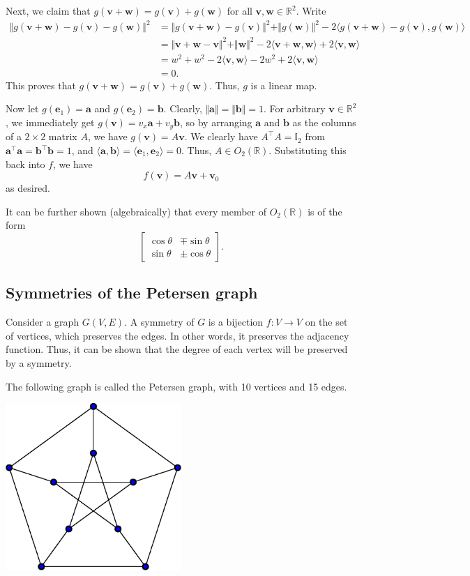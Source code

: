\documentclass[11pt]{article}
\newcommand{\R}{\mathbb{R}}
\renewcommand{\vec}[1]{\boldsymbol{#1}}
\newcommand{\vv}{\vec{v}}
\newcommand{\vw}{\vec{w}}
\newcommand{\ve}{\vec{e}}
\newcommand{\va}{\vec{a}}
\newcommand{\vb}{\vec{b}}
\newcommand{\norm}[1]{\Vert #1 \Vert}
\newcommand{\ip}[2]{\langle #1, #2 \rangle}
\theoremstyle{definition}
\theoremstyle{remark}
\numberwithin{equation}{section}
\begin{document}
    Next, we claim that $g(\vv + \vw) = g(\vv) + g(\vw)$ for all $\vv, \vw \in
    \R^2$. Write
    \begin{align*}
        \norm{g(\vv + \vw) - g(\vv) - g(\vw)}^2 &= \norm{g(\vv + \vw) - g(\vv)}^2 +
        \norm{g(\vw)}^2 - 2\ip{g(\vv + \vw) - g(\vv)}{g(\vw)} \\
        &= \norm{\vv + \vw - \vv}^2 + \norm{\vw}^2 - 2\ip{\vv + \vw}{\vw} +
        2\ip{\vv}{\vw} \\
        &= w^2 + w^2 - 2\ip{\vv}{\vw} - 2w^2 + 2\ip{\vv}{\vw} \\
        &= 0.
    \end{align*}
    This proves that $g(\vv + \vw) = g(\vv) + g(\vw)$. Thus, $g$ is a linear map.

    Now let $g(\ve_1) = \va$ and $g(\ve_2) = \vb$. Clearly, $\norm{\va} = \norm{\vb}
    = 1$. For arbitrary $\vv\in \R^2$, we immediately get $g(\vv) = v_x\va + v_y\vb$,
    so by arranging $\va$ and $\vb$ as the columns of a $2\times 2$ matrix $A$, we
    have $g(\vv) = A\vv$. We clearly have $A^\top A = \mathbb{I}_2$ from $\va^\top\va
    = \vb^\top\vb = 1$, and $\ip{\va}{\vb} = \ip{\ve_1}{\ve_2} = 0$. Thus, $A \in
    O_2(\R)$. Substituting this back into $f$, we have \[
        f(\vv) = A\vv + \vv_0
    \] as desired.

    It can be further shown (algebraically) that every member of $O_2(\R)$ is of the
    form \[
        \begin{bmatrix}
            \cos\theta & \mp\sin\theta \\ \sin\theta & \pm \cos\theta
        \end{bmatrix}.
    \] 


    \subsection{Symmetries of the Petersen graph}
    Consider a graph $G(V, E)$. A symmetry of $G$ is a bijection $f\colon V \to V$
    on the set of vertices, which preserves the edges. In other words, it preserves
    the adjacency function. Thus, it can be shown that the degree of each vertex will
    be preserved by a symmetry.

    The following graph is called the Petersen graph, with 10 vertices and 15 edges.

    \begin{center}
        \includegraphics[width=0.5\textwidth]{./petersen.eps}
    \end{center}
\end{document}

